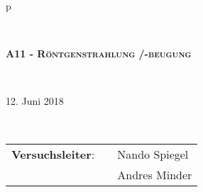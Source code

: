 \begin{tabular}{p{\textwidth}}

\begin{center}
\end{center}


\\

\begin{center}
\Huge{\textsc{
\textbf{A11 - Röntgenstrahlung /-beugung} \\
}}
\end{center}

\\

\begin{center}
\LARGE{12. Juni 2018}
\end{center}

\\

\vspace*{15cm}


\hrulefill
\begin{flushleft}
\begin{tabular}{lll}
\LARGE \textbf{Versuchsleiter}: & 	\hspace{2cm} & \LARGE Nando Spiegel\\
								& 	\hspace{2cm} & \LARGE Andres Minder\\
\end{tabular}
\end{flushleft}
\hrulefill
\end{tabular}
\newpage